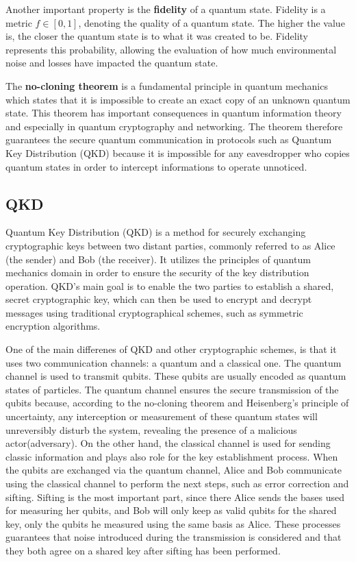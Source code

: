 \documentclass[12pt]{ieeetj}
\begin{document}
		Another important property is the \textbf{fidelity} of a quantum state.
		Fidelity is a metric  \( \textit{f} \in [0,1] \), denoting the quality of a quantum state.
		The higher the value is, the closer the quantum state is to what it was created to be.
		Fidelity represents this probability, allowing the evaluation of how much environmental noise
		and losses have impacted the quantum state.

		The \textbf{no-cloning theorem} is a fundamental principle in quantum mechanics 
		which states that it is impossible to create an exact copy of an unknown quantum state. 
		This theorem has important consequences in quantum information theory and especially in
		quantum cryptography and networking. The theorem therefore guarantees the secure quantum communication 
		in protocols such as Quantum Key Distribution (QKD) because it is impossible for any eavesdropper who copies
		quantum states in order to intercept informations to operate unnoticed.

		\subsection{QKD}

		Quantum Key Distribution (QKD) is a method for securely exchanging cryptographic keys between two distant parties\cite{powergrid}, 
		commonly referred to as Alice (the sender) and Bob (the receiver). 
		It utilizes the principles of quantum mechanics domain in order to ensure the security of the key distribution operation. 
		QKD's main goal is to enable the two parties to establish a shared, secret cryptographic key, 
		which can then be used to encrypt and decrypt messages using traditional cryptographical schemes, such as symmetric encryption algorithms.

		One of the main differenes of QKD and other cryptographic schemes, 
		is that it uses two communication channels: 
		a quantum and a classical one. 
		The quantum channel is used to transmit qubits.
		These qubits are usually encoded as quantum states of particles. 
		The quantum channel ensures the secure transmission of the qubits because, 
		according to the no-cloning theorem and 
		Heisenberg's principle of uncertainty, 
		any interception or measurement of these quantum states 
		will unreversibly disturb the system, revealing the presence of a malicious actor(adversary).
		On the other hand, the classical channel is used for sending classic information 
		and plays also role for the key establishment process.
		When the qubits are exchanged via the quantum channel, Alice and Bob communicate using the classical channel
		to perform the next steps, such as error correction and sifting. Sifting is the most important part, since there 
		Alice sends the bases used for measuring her qubits, and Bob will only keep as valid qubits for the shared key, only the
		qubits he measured using the same basis as Alice.
		These processes guarantees that noise introduced during the transmission is considered 
		and that they both agree on a shared key after sifting has been performed.
\end{document}
